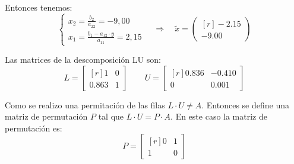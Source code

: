 \documentclass[../main.tex]{subfiles}
\begin{document}
\begin{example}
\begin{enumerate}
                    Entonces tenemos:
                    \begin{equation}
                        \left\lbrace
                        \begin{array}{ll}
                            x_2 = \frac{b_2}{a_{22}} = -9,00\\
                            x_1 = \frac{b_1 - a_{12} \cdot y}{a_{11}} = 2,15
                        \end{array}
                        \right.
                        \quad \Rightarrow \quad
                        \widetilde{x} = \begin{pmatrix*}[r]
                            -2.15\\
                            -9.00
                        \end{pmatrix*}
                    \end{equation}
        
                    Las matrices de la descomposición LU son:
                    \begin{equation}
                        L = \begin{bmatrix*}[r]
                            1 & 0\\
                            0.863 & 1
                        \end{bmatrix*}
                        \quad \quad
                        U = \begin{bmatrix*}[r]
                            0.836 & -0.410\\
                            0 & 0.001
                        \end{bmatrix*}
                    \end{equation}

                    Como se realizo una permitación de las filas $L \cdot U \neq A$. Entonces se define una matriz de permutación $P$ tal que $L \cdot U = P \cdot A$. En este caso la matriz de permutación es:
                    \begin{equation}
                        P = \begin{bmatrix*}[r]
                            0 & 1\\
                            1 & 0
                        \end{bmatrix*}
                    \end{equation}


\end{enumerate}
\end{example}
\end{document}
